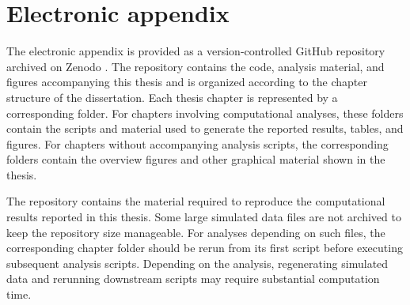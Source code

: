 \chapter{Electronic appendix}
\label{app:electronic-appendix}

The electronic appendix is provided as a version-controlled GitHub repository archived on Zenodo \citep{Peschel2026thesisRepo}. The repository contains the code, analysis material, and figures accompanying this thesis and is organized according to the chapter structure of the dissertation. Each thesis chapter is represented by a corresponding folder. For chapters involving computational analyses, these folders contain the scripts and material used to generate the reported results, tables, and figures. For chapters without accompanying analysis scripts, the corresponding folders contain the overview figures and other graphical material shown in the thesis.

The repository contains the material required to reproduce the computational results reported in this thesis. Some large simulated data files are not archived to keep the repository size manageable. For analyses depending on such files, the corresponding chapter folder should be rerun from its first script before executing subsequent analysis scripts. Depending on the analysis, regenerating simulated data and rerunning downstream scripts may require substantial computation time.